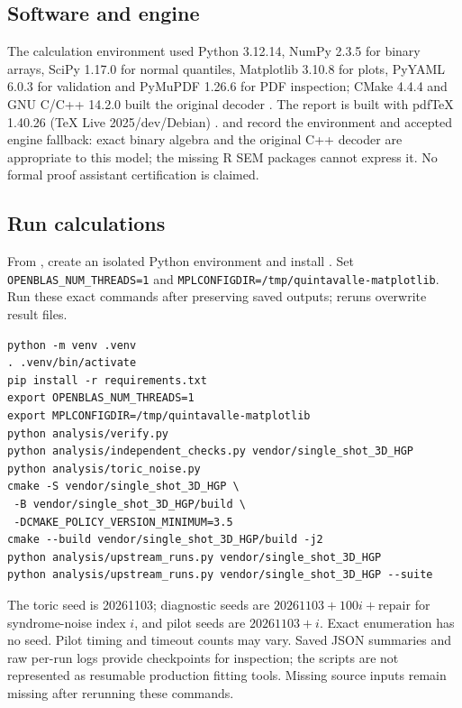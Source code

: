 \subsection{Software and engine}
The calculation environment used Python 3.12.14, NumPy 2.3.5 for binary arrays, SciPy 1.17.0 for normal quantiles, Matplotlib 3.10.8 for plots, PyYAML 6.0.3 for validation and PyMuPDF 1.26.6 for PDF inspection; CMake 4.4.4 and GNU C/C++ 14.2.0 built the original decoder \citep{software,upstream}. The report is built with pdfTeX 1.40.26 (TeX Live 2025/dev/Debian) \citep{software}. \href{https://github.com/alectionary/vibe-math/blob/master/formalization/quintavalle-hgp/provenance/environment.json}{} and \href{https://github.com/alectionary/vibe-math/blob/master/formalization/quintavalle-hgp/provenance/engine-preflight.json}{} record the environment and accepted engine fallback: exact binary algebra and the original C++ decoder are appropriate to this model; the missing R SEM packages cannot express it. No formal proof assistant certification is claimed.

\subsection{Run calculations}
From , create an isolated Python environment and install . Set \texttt{OPENBLAS\_NUM\_THREADS=1} and \texttt{MPLCONFIGDIR=/tmp/quintavalle-matplotlib}. Run these exact commands after preserving saved outputs; reruns overwrite result files.
\begin{verbatim}
python -m venv .venv
. .venv/bin/activate
pip install -r requirements.txt
export OPENBLAS_NUM_THREADS=1
export MPLCONFIGDIR=/tmp/quintavalle-matplotlib
python analysis/verify.py
python analysis/independent_checks.py vendor/single_shot_3D_HGP
python analysis/toric_noise.py
cmake -S vendor/single_shot_3D_HGP \
 -B vendor/single_shot_3D_HGP/build \
 -DCMAKE_POLICY_VERSION_MINIMUM=3.5
cmake --build vendor/single_shot_3D_HGP/build -j2
python analysis/upstream_runs.py vendor/single_shot_3D_HGP
python analysis/upstream_runs.py vendor/single_shot_3D_HGP --suite
\end{verbatim}
The toric seed is 20261103; diagnostic seeds are $20261103+100i+\mathrm{repair}$ for syndrome-noise index $i$, and pilot seeds are $20261103+i$. Exact enumeration has no seed. Pilot timing and timeout counts may vary. Saved JSON summaries and raw per-run logs provide checkpoints for inspection; the scripts are not represented as resumable production fitting tools. Missing source inputs remain missing after rerunning these commands.

